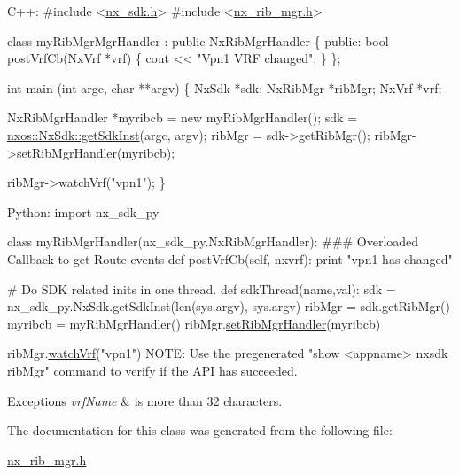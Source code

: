 \begin{DoxyCode}
 C++:
\textcolor{preprocessor}{      #include <\mbox{\hyperlink{nx__sdk_8h}{nx\_sdk.h}}>}
\textcolor{preprocessor}{      #include <\mbox{\hyperlink{nx__rib__mgr_8h}{nx\_rib\_mgr.h}}>}

      \textcolor{keyword}{class }myRibMgrMgrHandler : \textcolor{keyword}{public} NxRibMgrHandler \{
         \textcolor{keyword}{public}:
            \textcolor{keywordtype}{bool} postVrfCb(NxVrf *vrf) \{
                 cout << \textcolor{stringliteral}{"Vpn1 VRF changed"};
            \}
      \};

      \textcolor{keywordtype}{int}  main (\textcolor{keywordtype}{int} argc, \textcolor{keywordtype}{char} **argv)
      \{
           NxSdk    *sdk;
           NxRibMgr *ribMgr;
           NxVrf    *vrf;

           NxRibMgrHandler *myribcb = \textcolor{keyword}{new} myRibMgrHandler();
           sdk = \mbox{\hyperlink{classnxos_1_1_nx_sdk_a5050e2d26c40744b4fc7862068a83f39}{nxos::NxSdk::getSdkInst}}(argc, argv);
           ribMgr = sdk->getRibMgr();
           ribMgr->setRibMgrHandler(myribcb);

           ribMgr->watchVrf(\textcolor{stringliteral}{"vpn1"});
      \}

 Python:
    \textcolor{keyword}{import} nx\_sdk\_py

    \textcolor{keyword}{class }myRibMgrHandler(nx\_sdk\_py.NxRibMgrHandler):
\textcolor{preprocessor}{    ### Overloaded Callback to get Route events}
          def postVrfCb(self, nxvrf):
              print "vpn1 has changed"

\textcolor{preprocessor}{    # Do SDK related inits in one thread.}
    def sdkThread(name,val):
        sdk = nx\_sdk\_py.NxSdk.getSdkInst(len(sys.argv), sys.argv)
        ribMgr = sdk.getRibMgr()
        myribcb = myRibMgrHandler()
        ribMgr.\mbox{\hyperlink{classnxos_1_1_nx_rib_mgr_ac42dd29e34f9c508614733dbec518b99}{setRibMgrHandler}}(myribcb)

        ribMgr.\mbox{\hyperlink{classnxos_1_1_nx_rib_mgr_a35e2a52be337d47cd111803f64aca904}{watchVrf}}("vpn1")
NOTE: Use the pregenerated "show <appname> nxsdk ribMgr" command
      to verify if the API has succeeded.
\end{DoxyCode}



\begin{DoxyExceptions}{Exceptions}
{\em vrf\+Name} & is more than 32 characters. \\
\hline
\end{DoxyExceptions}


The documentation for this class was generated from the following file\+:\begin{DoxyCompactItemize}
\item 
\mbox{\hyperlink{nx__rib__mgr_8h}{nx\+\_\+rib\+\_\+mgr.\+h}}\end{DoxyCompactItemize}
